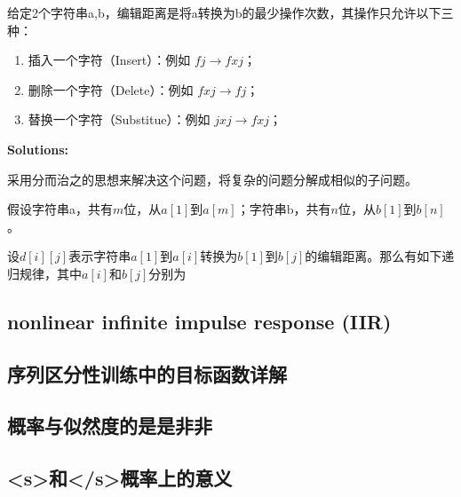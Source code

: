 给定2个字符串a,b，编辑距离是将a转换为b的最少操作次数，其操作只允许以下三种：
\begin{enumerate}
	\item 插入一个字符（Insert）：例如 $fj\rightarrow{fxj}$；
	\item 删除一个字符（Delete）：例如 $fxj\rightarrow{fj}$；
	\item 替换一个字符（Substitue）：例如 $jxj\rightarrow{fxj}$；
\end{enumerate}

{\bf Solutions:}

采用分而治之的思想来解决这个问题，将复杂的问题分解成相似的子问题。

假设字符串a，共有$m$位，从$a[1]$到$a[m]$；字符串b，共有$n$位，从$b[1]$到$b[n]$。

设$d[i][j]$表示字符串$a[1]$到$a[i]$转换为$b[1]$到$b[j]$的编辑距离。那么有如下递归规律，其中$a[i]$和$b[j]$分别为

\subsection{nonlinear infinite impulse response (IIR)}

\subsection{序列区分性训练中的目标函数详解}
\label{sub:sdt-obj}


\subsection{概率与似然度的是是非非}

\subsection{<s>和</s>概率上的意义}
\label{sub:start-end}















